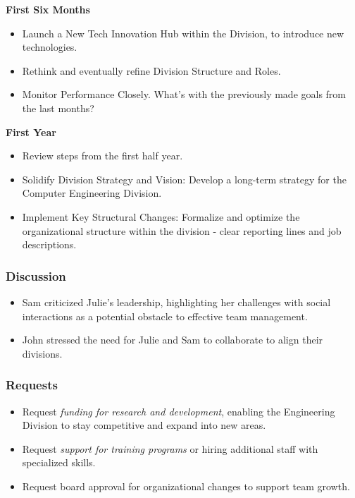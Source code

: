 \documentclass[a4paper,10pt]{article}
\begin{document}
\noindent \textbf{First Six Months}
\begin{itemize}
    \item Launch a New Tech Innovation Hub within the Division, to introduce new technologies.
    \item Rethink and eventually refine Division Structure and Roles.
    \item Monitor Performance Closely. What's with the previously made goals from the last months?
\end{itemize}

\noindent \textbf{First Year}
\begin{itemize}
    \item Review steps from the first half year.
    \item Solidify Division Strategy and Vision: Develop a long-term strategy for the Computer Engineering Division.
    \item Implement Key Structural Changes: Formalize and optimize the organizational structure within the division - clear reporting lines and job descriptions. 
\end{itemize}

\subsubsection{Discussion}

\begin{itemize}
    \item Sam criticized Julie's leadership, highlighting her challenges with social interactions as a potential obstacle to effective team management.
    \item John stressed the need for Julie and Sam to collaborate to align their divisions.
\end{itemize}

\subsubsection{Requests}

\begin{itemize}
    \item Request \textit{funding for research and development}, enabling the Engineering Division to stay competitive and expand into new areas. 
    \item Request \textit{support for training programs} or hiring additional staff with specialized skills.
    \item Request board approval for organizational changes to support team growth.
\end{itemize}
\end{document}

